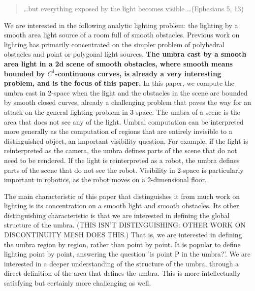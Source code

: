 \documentclass[9pt]{article}
\newif\ifJournal
\begin{document}
\begin{quote}
\ldots but everything exposed by the light becomes visible \ldots (Ephesians 5, 13)
\end{quote}

We are interested in the following analytic lighting problem:
the lighting by a smooth area light source 
of a room full of smooth obstacles.
Previous work on lighting has primarily concentrated on the simpler problem of
polyhedral obstacles and point or polygonal light sources.
{\bf The umbra cast by a smooth area light in a 2d scene
of smooth obstacles, where smooth means bounded by $C^1$-continuous curves,
is already a very interesting problem, and is the focus of this paper.}
In this paper, we compute the umbra cast in 2-space 
when the light and the obstacles %
in the scene are bounded by smooth closed curves,
already a challenging problem that paves the way for an attack 
on the general lighting problem in 3-space.
The umbra of a scene is the area that does not see any of the light.
Umbral computation can be interpreted
more generally as the computation of regions that are entirely invisible
to a distinguished object, an important visibility question.
For example, if the light is reinterpreted as the camera,
the umbra defines parts of the scene that do not need to be rendered.
If the light is reinterpreted as a robot, the umbra defines parts of the
scene that do not see the robot.
Visibility in 2-space is particularly important in robotics, as the robot
moves on a 2-dimensional floor.

\ifJournal
	\begin{defn2}
	The {\bf umbra of a scene} is the collection of regions 
	in the scene that do not see any of the light.
	\end{defn2}
\fi

The main characteristic of this paper that distinguishes it from much work on
lighting is its concentration on a smooth light and smooth obstacles.
Its other distinguishing characteristic is that we are interested in 
defining the global structure of the umbra.
(THIS ISN'T DISTINGUISHING: OTHER WORK ON DISCONTINUITY MESH DOES THIS.)
That is, we are interested in defining the umbra region by region,
rather than point by point.
It is popular to define lighting point by point,
answering the question 'is point P in the umbra?'.
We are interested in a deeper understanding of the structure of the umbra,
through a direct definition of the area that defines the umbra.
This is more intellectually satisfying but certainly more challenging as well.
\end{document}
